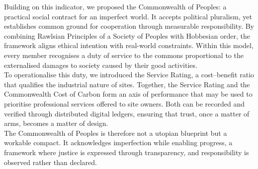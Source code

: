 \documentclass[12pt, oneside]{article}   	%
\begin{document}
Building on this indicator, we proposed the Commonwealth of Peoples: a practical social contract for an imperfect world.
It accepts political pluralism, yet establishes common ground for cooperation through measurable responsibility.
By combining Rawlsian Principles of a Society of Peoples with Hobbesian order, the framework aligns ethical intention with real-world constraints.
Within this model, every member recognises a duty of service to the commons proportional to the externalised damages to society caused by their good activities.\\

To operationalise this duty, we introduced the Service Rating, a cost–benefit ratio that qualifies the industrial nature of sites.
Together, the Service Rating and the Commonwealth Cost of Carbon form an axis of performance that may be used to prioritise professional services offered to site owners.
Both can be recorded and verified through distributed digital ledgers, ensuring that trust, once a matter of arms, becomes a matter of design.\\

The Commonwealth of Peoples is therefore not a utopian blueprint but a workable compact.
It acknowledges imperfection while enabling progress, a framework where justice is expressed through transparency, and responsibility is observed rather than declared.\\
\end{document}
